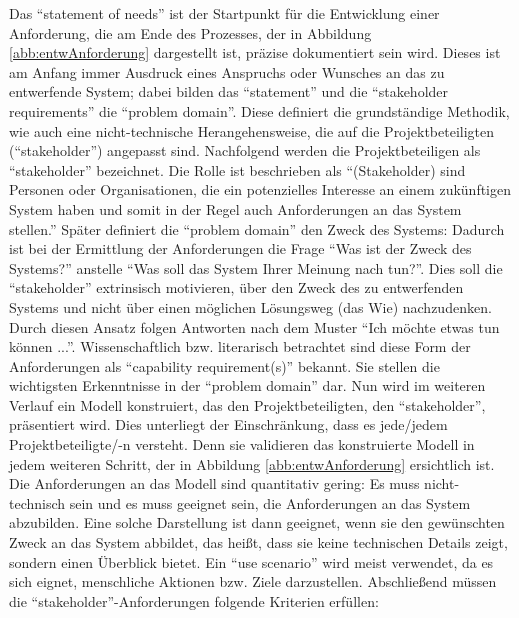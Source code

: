 Das \enquote{statement of needs} ist der Startpunkt für die Entwicklung einer Anforderung, die am Ende des Prozesses, der in Abbildung \vref{abb:entwAnforderung} dargestellt ist, präzise dokumentiert sein wird. Dieses ist am Anfang immer Ausdruck eines Anspruchs oder Wunsches an das zu entwerfende System; dabei bilden das \enquote{statement} und die \enquote{stakeholder requirements} die \enquote{problem domain}. Diese definiert die grundständige Methodik, wie auch eine nicht-technische Herangehensweise, die auf die Projektbeteiligten (\enquote{stakeholder}) angepasst sind. Nachfolgend werden die Projektbeteiligen als \enquote{stakeholder} bezeichnet. Die Rolle ist beschrieben als \enquote{(Stakeholder) sind Personen oder Organisationen, die ein potenzielles Interesse an einem zukünftigen System haben und somit in der Regel auch Anforderungen an das System stellen.}\autocite[][S.\,8]{partsch_requirements-engineering_2010} Später definiert die \enquote{problem domain} den Zweck des Systems: Dadurch ist bei der Ermittlung der Anforderungen die Frage \enquote{Was ist der Zweck des Systems?} anstelle \enquote{Was soll das System Ihrer Meinung nach tun?}. Dies soll die \enquote{stakeholder} extrinsisch motivieren, über den Zweck des zu entwerfenden Systems und nicht über einen möglichen Lösungsweg (das Wie) nachzudenken. Durch diesen Ansatz folgen Antworten nach dem Muster \enquote{Ich möchte etwas tun können ...}. Wissenschaftlich bzw. literarisch betrachtet sind diese Form der Anforderungen als \enquote{capability requirement(s)}\autocite[vgl.][S.\,94]{hull_requirements_2011} bekannt. Sie stellen die wichtigsten Erkenntnisse in der \enquote{problem domain} dar. Nun wird im weiteren Verlauf ein Modell konstruiert, das den Projektbeteiligten, den \enquote{stakeholder}, präsentiert wird. Dies unterliegt der Einschränkung, dass es jede/jedem Projektbeteiligte/-n versteht. Denn sie validieren das konstruierte Modell in jedem weiteren Schritt, der in Abbildung \vref{abb:entwAnforderung} ersichtlich ist. Die Anforderungen an das Modell sind quantitativ gering: Es muss nicht-technisch sein und es muss geeignet sein, die Anforderungen an das System abzubilden. Eine solche Darstellung ist dann geeignet, wenn sie den gewünschten Zweck an das System abbildet, das heißt, dass sie keine technischen Details zeigt, sondern einen Überblick bietet. Ein \enquote{use scenario}\autocite[vgl.][S.\,94]{hull_requirements_2011} wird meist verwendet, da es sich eignet, menschliche Aktionen bzw. Ziele darzustellen. Abschließend müssen die \enquote{stakeholder}-Anforderungen folgende Kriterien erfüllen: 

